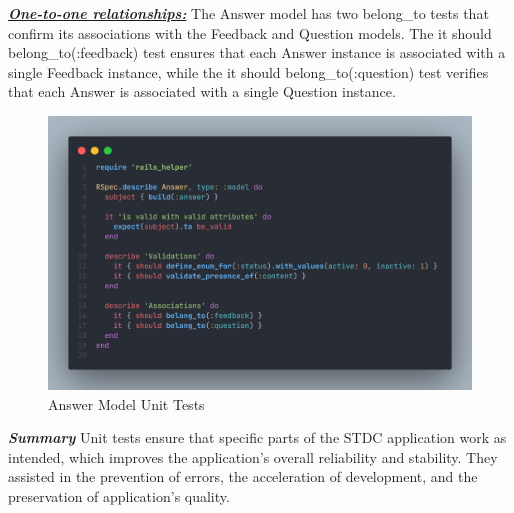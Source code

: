 \begin{justify}
\vspace{0.25cm}
\noindent\textbf{\textit{\underline{One-to-one relationships:}}} The Answer model has two belong\_to tests that confirm its associations with the Feedback and Question models. The it { should belong\_to(:feedback) } test ensures that each Answer instance is associated with a single Feedback instance, while the it { should belong\_to(:question) } test verifies that each Answer is associated with a single Question instance.

    \begin{figure}[H]
        \centerline{\includegraphics[width=140mm,scale=1]{figures/implementation_and_testing/testing/AUT/answer/all.png}}
        \caption{Answer Model Unit Tests}
        \label{Answer Model Unit Tests}
    \end{figure}



\newendline \textbf{\textit{Summary}}\newendline
Unit tests ensure that specific parts of the STDC application work as intended, which improves the application's overall reliability and stability. They assisted in the prevention of errors, the acceleration of development, and the preservation of application's quality.

\end{justify}
\clearpage



